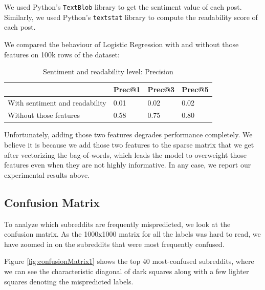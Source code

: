 \documentclass{sig-alternate-05-2015}
\begin{document}
We used Python's \verb+TextBlob+\cite{textblob} library to get the sentiment value of each post. Similarly, we used Python's \verb+textstat+\cite{textstat} library to compute the readability score of each post.

We compared the behaviour of Logistic Regression with and without those features on 100k rows of the dataset:

\begin{table}[H]
\begin{tabular}{|l|l|l|l|}
\hline
    & Prec@1 & Prec@3 & Prec@5 \\ \hline
With sentiment and readability & 0.01        & 0.02        & 0.02        \\ \hline
Without those features  & 0.58        & 0.75        & 0.80       \\ \hline
\end{tabular}
\caption{Sentiment and readability level: Precision}
\label{table:sentiment}
\end{table}

Unfortunately, adding those two features degrades performance completely. We believe it is because we add those two features to the sparse matrix that we get after vectorizing the bag-of-words, which leads the model to overweight those features even when they are not highly informative. In any case, we report our experimental results above.

\subsection{Confusion Matrix}

To analyze which subreddits are frequently mispredicted, we look at the confusion matrix. As the 1000x1000 matrix for all the labels was hard to read, we have zoomed in on the subreddits that were most frequently confused.

Figure \ref{fig:confusionMatrix1} shows the top 40 most-confused subreddits, where we can see the characteristic diagonal of dark squares along with a few lighter squares denoting the mispredicted labels.
\end{document}
